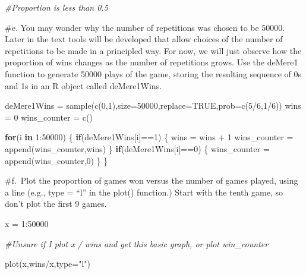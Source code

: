 \documentclass[
]{article}
\newenvironment{Shaded}{\begin{snugshade}}{\end{snugshade}}
\newcommand{\AttributeTok}[1]{\textcolor[rgb]{0.77,0.63,0.00}{#1}}
\newcommand{\CommentTok}[1]{\textcolor[rgb]{0.56,0.35,0.01}{\textit{#1}}}
\newcommand{\ConstantTok}[1]{\textcolor[rgb]{0.00,0.00,0.00}{#1}}
\newcommand{\ControlFlowTok}[1]{\textcolor[rgb]{0.13,0.29,0.53}{\textbf{#1}}}
\newcommand{\DecValTok}[1]{\textcolor[rgb]{0.00,0.00,0.81}{#1}}
\newcommand{\FunctionTok}[1]{\textcolor[rgb]{0.00,0.00,0.00}{#1}}
\newcommand{\NormalTok}[1]{#1}
\newcommand{\OtherTok}[1]{\textcolor[rgb]{0.56,0.35,0.01}{#1}}
\newcommand{\SpecialCharTok}[1]{\textcolor[rgb]{0.00,0.00,0.00}{#1}}
\newcommand{\StringTok}[1]{\textcolor[rgb]{0.31,0.60,0.02}{#1}}
\begin{document}
\begin{Shaded}
\begin{Highlighting}[]
\CommentTok{\#Proportion is less than 0.5}
\end{Highlighting}
\end{Shaded}

\#e. You may wonder why the number of repetitions was chosen to be
50000. Later in the text tools will be developed that allow choices of
the number of repetitions to be made in a principled way. For now, we
will just observe how the proportion of wins changes as the number of
repetitions grows. Use the deMere1 function to generate 50000 plays of
the game, storing the resulting sequence of 0s and 1s in an R object
called deMere1Wins.

\begin{Shaded}
\begin{Highlighting}[]
\NormalTok{deMere1Wins }\OtherTok{=} \FunctionTok{sample}\NormalTok{(}\FunctionTok{c}\NormalTok{(}\DecValTok{0}\NormalTok{,}\DecValTok{1}\NormalTok{),}\AttributeTok{size=}\DecValTok{50000}\NormalTok{,}\AttributeTok{replace=}\ConstantTok{TRUE}\NormalTok{,}\AttributeTok{prob=}\FunctionTok{c}\NormalTok{(}\DecValTok{5}\SpecialCharTok{/}\DecValTok{6}\NormalTok{,}\DecValTok{1}\SpecialCharTok{/}\DecValTok{6}\NormalTok{))}
\NormalTok{wins }\OtherTok{=} \DecValTok{0}
\NormalTok{wins\_counter }\OtherTok{=} \FunctionTok{c}\NormalTok{()}

\ControlFlowTok{for}\NormalTok{(i }\ControlFlowTok{in} \DecValTok{1}\SpecialCharTok{:}\DecValTok{50000}\NormalTok{)}
\NormalTok{\{}
  \ControlFlowTok{if}\NormalTok{(deMere1Wins[i]}\SpecialCharTok{==}\DecValTok{1}\NormalTok{)}
\NormalTok{  \{}
\NormalTok{    wins }\OtherTok{=}\NormalTok{ wins }\SpecialCharTok{+} \DecValTok{1}
\NormalTok{    wins\_counter }\OtherTok{=} \FunctionTok{append}\NormalTok{(wins\_counter,wins)}
\NormalTok{  \}}
  \ControlFlowTok{if}\NormalTok{(deMere1Wins[i]}\SpecialCharTok{==}\DecValTok{0}\NormalTok{)}
\NormalTok{  \{}
\NormalTok{    wins\_counter }\OtherTok{=} \FunctionTok{append}\NormalTok{(wins\_counter,}\DecValTok{0}\NormalTok{)}
\NormalTok{  \}}
\NormalTok{\}}
\end{Highlighting}
\end{Shaded}

\#f.~Plot the proportion of games won versus the number of games played,
using a line (e.g., type = ``l'' in the plot() function.) Start with the
tenth game, so don't plot the first 9 games.

\begin{Shaded}
\begin{Highlighting}[]
\NormalTok{x }\OtherTok{=} \DecValTok{1}\SpecialCharTok{:}\DecValTok{50000}

\CommentTok{\#Unsure if I plot x / wins and get this basic graph, or plot win\_counter}

\FunctionTok{plot}\NormalTok{(x,wins}\SpecialCharTok{/}\NormalTok{x,}\AttributeTok{type=}\StringTok{"l"}\NormalTok{)}
\end{Highlighting}
\end{Shaded}
\end{document}

